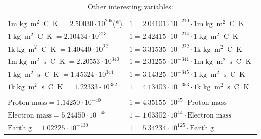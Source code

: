\begin{center}
\begin{longtable}{l l}
{\color{gray}$1 \bm{\mathrm{ m}}\operatorname{kg}{\operatorname{m}^2}{}{\operatorname{C}}{\operatorname{K}} = 2.50030\cdot10^{205} $}\quad(*) & {\color{gray}$ 1 = 2.04101\cdot10^{-210} \cdot 1 \bm{\mathrm{ m}}\operatorname{kg}{\operatorname{m}^2}{}{\operatorname{C}}{\operatorname{K}}$}  \\
{\color{black}$1 \bm{\mathrm{ }}\operatorname{kg}{\operatorname{m}^2}{}{\operatorname{C}}{\operatorname{K}} = 2.10434\cdot10^{213} $}   & {\color{black}$ 1 = 2.42415\cdot10^{-214} \cdot 1 \bm{\mathrm{ }}\operatorname{kg}{\operatorname{m}^2}{}{\operatorname{C}}{\operatorname{K}}$}  \\
{\color{gray}$1 \bm{\mathrm{ k}}\operatorname{kg}{\operatorname{m}^2}{}{\operatorname{C}}{\operatorname{K}} = 1.40440\cdot10^{221} $}   & {\color{gray}$ 1 = 3.31535\cdot10^{-222} \cdot 1 \bm{\mathrm{ k}}\operatorname{kg}{\operatorname{m}^2}{}{\operatorname{C}}{\operatorname{K}}$}  \\
{\color{gray}$1 \bm{\mathrm{ m}}\operatorname{kg}{\operatorname{m}^2}{\operatorname{s}}{\operatorname{C}}{\operatorname{K}} = 2.20553\cdot10^{340} $}   & {\color{gray}$ 1 = 2.31255\cdot10^{-341} \cdot 1 \bm{\mathrm{ m}}\operatorname{kg}{\operatorname{m}^2}{\operatorname{s}}{\operatorname{C}}{\operatorname{K}}$}  \\
{\color{black}$1 \bm{\mathrm{ }}\operatorname{kg}{\operatorname{m}^2}{\operatorname{s}}{\operatorname{C}}{\operatorname{K}} = 1.45324\cdot10^{344} $}   & {\color{black}$ 1 = 3.14325\cdot10^{-345} \cdot 1 \bm{\mathrm{ }}\operatorname{kg}{\operatorname{m}^2}{\operatorname{s}}{\operatorname{C}}{\operatorname{K}}$}  \\
{\color{gray}$1 \bm{\mathrm{ k}}\operatorname{kg}{\operatorname{m}^2}{\operatorname{s}}{\operatorname{C}}{\operatorname{K}} = 1.22333\cdot10^{352} $}   & {\color{gray}$ 1 = 4.13403\cdot10^{-353} \cdot 1 \bm{\mathrm{ k}}\operatorname{kg}{\operatorname{m}^2}{\operatorname{s}}{\operatorname{C}}{\operatorname{K}}$}  \\
\caption*{Other interesting variables:}\\{\color{black}$\textrm{Proton mass} = 1.14250\cdot10^{-40} $}   & {\color{black}$ 1 = 4.35155\cdot10^{35} \cdot \textrm{Proton mass}$}  \\
{\color{black}$\textrm{Electron mass} = 5.24450\cdot10^{-45} $}   & {\color{black}$ 1 = 1.03302\cdot10^{44} \cdot \textrm{Electron mass}$}  \\
{\color{black}$\textrm{Earth g} = 1.02225\cdot10^{-130} $}   & {\color{black}$ 1 = 5.34234\cdot10^{125} \cdot \textrm{Earth g}$}  \\

\end{longtable}
\end{center}
